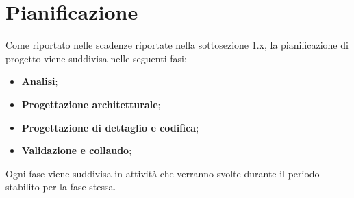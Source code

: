 \section{Pianificazione}
Come riportato nelle scadenze riportate nella sottosezione 1.x, la pianificazione di progetto viene suddivisa nelle seguenti fasi:
\begin{itemize}
	\item \textbf{Analisi};
	\item \textbf{Progettazione architetturale};
	\item \textbf{Progettazione di dettaglio e codifica};
	\item \textbf{Validazione e collaudo};
\end{itemize}
Ogni fase viene suddivisa in attività che verranno svolte durante il periodo stabilito per la fase stessa.

\newpage

\newpage

\newpage
